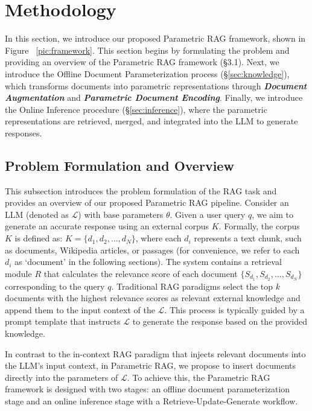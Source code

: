 \documentclass[sigconf,natbib=true,anonymous=false]{acmart}
\begin{document}
\section{Methodology}
\label{sec:method}
In this section, we introduce our proposed {Parametric RAG} framework, shown in Figure ~\ref{pic:framework}.
This section begins by formulating the problem and providing an overview of the Parametric RAG framework (\S 3.1). 
Next, we introduce the Offline Document Parameterization process (\S\ref{sec:knowledge}), which transforms documents into parametric representations through \textit{\textbf{Document Augmentation}} and \textit{\textbf{Parametric Document Encoding}}. 
Finally, we introduce the Online Inference procedure (\S\ref{sec:inference}), where the parametric representations are retrieved, merged, and integrated into the LLM to generate responses.

\subsection{Problem Formulation and Overview}

This subsection introduces the problem formulation of the RAG task and provides an overview of our proposed Parametric RAG pipeline. 
Consider an LLM (denoted as \(\mathcal L\)) with base parameters \(\theta\). Given a user query \(q\), we aim to generate an accurate response using an external corpus \(K\). 
Formally, the corpus \(K\) is defined as:
$K = \{d_1, d_2, \ldots, d_N\}$,
where each \(d_i\) represents a text chunk, such as documents, Wikipedia articles, or passages (for convenience, we refer to each $d_i$ as ‘document’ in the following sections). 
The system contains a retrieval module \(R\) that calculates the relevance score of each document \(\{S_{d_1}, S_{d_2}, \ldots, S_{d_N}\}\) corresponding to the query \(q\).
Traditional RAG paradigms select the top \(k\) documents with the highest relevance scores as relevant external knowledge and append them to the input context of the \(\mathcal L\). 
This process is typically guided by a prompt template that instructs \(\mathcal L\) to generate the response based on the provided knowledge. 


In contrast to the in-context RAG paradigm that injects relevant documents into the LLM's input context, 
in Parametric RAG, we propose to insert documents directly into the parameters of \(\mathcal L\).
To achieve this, the Parametric RAG framework is designed with two stages: an offline document parameterization stage and an online inference stage with a Retrieve-Update-Generate workflow.
\end{document}
